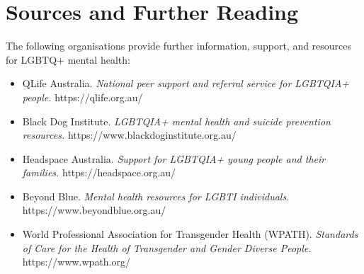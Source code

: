 \section*{Sources and Further Reading}
The following organisations provide further information, support, and resources for LGBTQ+ mental health:
\begin{itemize}
    \item QLife Australia. \textit{National peer support and referral service for LGBTQIA+ people.} https://qlife.org.au/
    \item Black Dog Institute. \textit{LGBTQIA+ mental health and suicide prevention resources.} https://www.blackdoginstitute.org.au/
    \item Headspace Australia. \textit{Support for LGBTQIA+ young people and their families.} https://headspace.org.au/
    \item Beyond Blue. \textit{Mental health resources for LGBTI individuals.} https://www.beyondblue.org.au/
    \item World Professional Association for Transgender Health (WPATH). \textit{Standards of Care for the Health of Transgender and Gender Diverse People.} https://www.wpath.org/
\end{itemize}
